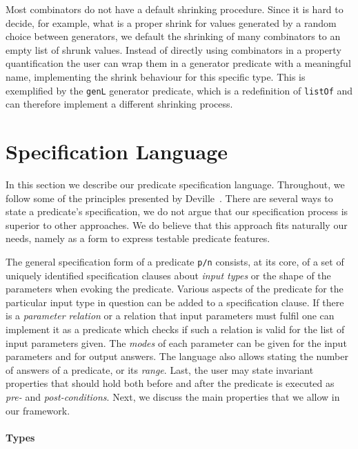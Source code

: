 \documentclass[runningheads,a4paper]{llncs}
\newcommand{\yap}[1]{\lstinline[style=yap]{#1}}
\begin{document}
Most combinators do not have a default shrinking procedure.
%
Since it is hard to decide, for example, what is a proper shrink for
values generated by a random choice between generators, we default
the shrinking of many combinators to an empty list of shrunk values.
%
Instead of directly using combinators in a property quantification
the user can wrap them in a generator predicate with a meaningful name,
implementing the shrink behaviour for this specific type.
%
This is exemplified by the \yap{genL} generator predicate, which is a
redefinition of \yap{listOf} and can therefore implement a different
shrinking process.


\section{Specification Language}
\label{sec:pred-spec}

In this section we describe our predicate specification language.
%
Throughout, we follow some of the principles presented
by Deville~\cite{Deville1990logprog}.
%
There are several ways to state a predicate's specification, we do not
argue that our specification process is superior to other approaches.
%
We do believe that this approach fits naturally our needs, namely as a
form to express testable predicate features. 


The general specification form of a predicate \yap{p/n} consists, at its
core, of a set of uniquely identified specification clauses about
\emph{input types} or the shape of the parameters when evoking the
predicate.
%
Various aspects of the predicate for the particular input type in
question can be added to a specification clause.
%
If there is a \emph{parameter relation} or a relation that input
parameters must fulfil one can implement it as a predicate
which checks if such a relation is valid for the list of input
parameters given.
%
The \emph{modes} of each parameter can be given for the input parameters and
for output answers.
%
The language also allows stating the number of
answers of a predicate,
or its \emph{range}.
%
Last, the user may state invariant properties that should hold both
before and after the predicate is executed as \emph{pre-} and \emph{post-conditions}.
%
Next, we discuss the main properties that we allow in our framework.

\paragraph{\bf Types}
\end{document}
